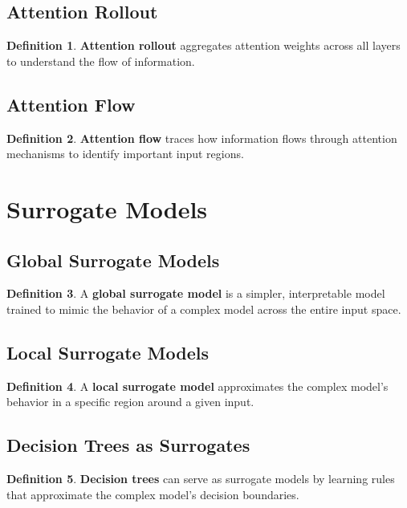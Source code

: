 \documentclass[11pt]{article}
\theoremstyle{definition}
\newtheorem{definition}{Definition}[section]
\begin{document}
\subsection{Attention Rollout}
\begin{definition}
\textbf{Attention rollout} aggregates attention weights across all layers to understand the flow of information.
\end{definition}

\subsection{Attention Flow}
\begin{definition}
\textbf{Attention flow} traces how information flows through attention mechanisms to identify important input regions.
\end{definition}

\section{Surrogate Models}

\subsection{Global Surrogate Models}
\begin{definition}
A \textbf{global surrogate model} is a simpler, interpretable model trained to mimic the behavior of a complex model across the entire input space.
\end{definition}

\subsection{Local Surrogate Models}
\begin{definition}
A \textbf{local surrogate model} approximates the complex model's behavior in a specific region around a given input.
\end{definition}

\subsection{Decision Trees as Surrogates}
\begin{definition}
\textbf{Decision trees} can serve as surrogate models by learning rules that approximate the complex model's decision boundaries.
\end{definition}
\end{document}
